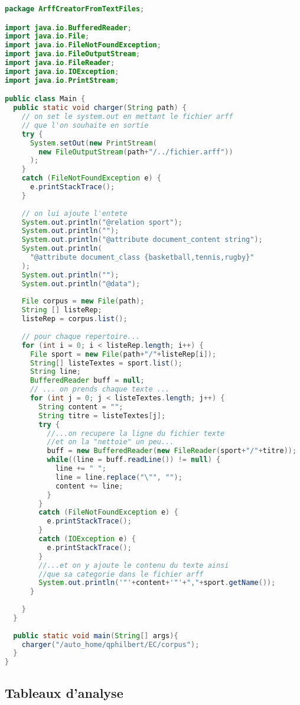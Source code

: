 \documentclass[a4paper,11pt]{article}
\begin{document}
\begin{lstlisting}[language=Java,frame=none]
package ArffCreatorFromTextFiles;

import java.io.BufferedReader;
import java.io.File;
import java.io.FileNotFoundException;
import java.io.FileOutputStream;
import java.io.FileReader;
import java.io.IOException;
import java.io.PrintStream;

public class Main {
  public static void charger(String path) {
    // on set le system.out en mettant le fichier arff
    // que l'on souhaite en sortie
    try {
      System.setOut(new PrintStream(
        new FileOutputStream(path+"/../fichier.arff"))
      );
    } 
    catch (FileNotFoundException e) {
      e.printStackTrace();
    }
    
    // on lui ajoute l'entete
    System.out.println("@relation sport");
    System.out.println("");
    System.out.println("@attribute document_content string");
    System.out.println(
      "@attribute document_class {basketball,tennis,rugby}"
    );
    System.out.println("");
    System.out.println("@data");
    
    File corpus = new File(path);
    String [] listeRep;
    listeRep = corpus.list();
    
    // pour chaque repertoire...
    for (int i = 0; i < listeRep.length; i++) {
      File sport = new File(path+"/"+listeRep[i]);
      String[] listeTextes = sport.list();
      String line;
      BufferedReader buff = null;
      // ... on prends chaque texte ...
      for (int j = 0; j < listeTextes.length; j++) {
        String content = "";
        String titre = listeTextes[j];
        try {
          //...on recupere la ligne du fichier texte
          //et on la "nettoie" un peu...
          buff = new BufferedReader(new FileReader(sport+"/"+titre));
          while((line = buff.readLine()) != null) {
            line += " ";
            line = line.replace("\"", "");
            content += line;
          }
        } 
        catch (FileNotFoundException e) {
          e.printStackTrace();
        } 
        catch (IOException e) {
          e.printStackTrace();
        }
        //...et on y ajoute le contenu du texte ainsi
        //que sa categorie dans le fichier arff
        System.out.println('"'+content+'"'+","+sport.getName());
      }
      
    }
  }
    
  public static void main(String[] args){
    charger("/auto_home/qphilbert/EC/corpus");
  } 
}
\end{lstlisting}

\newpage
\subsection*{Tableaux d'analyse}

\end{document}
